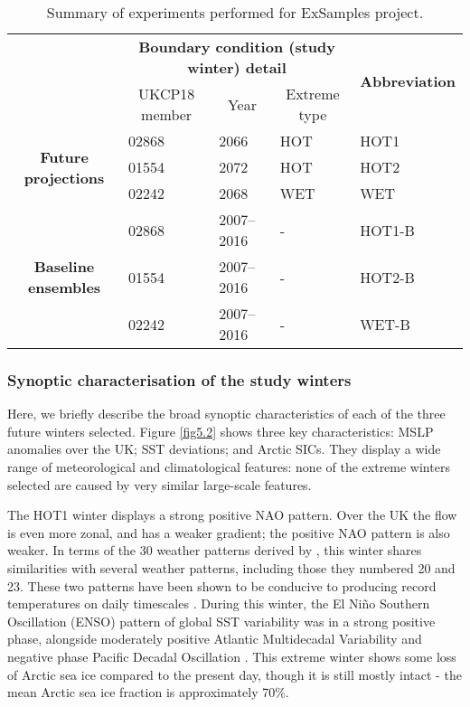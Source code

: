       \begin{table}[h]
        \centering
        \footnotesize
        \begin{tabular}{cllll}
          \toprule
          \multicolumn{1}{l}{\multirow{2}{*}{}}&\multicolumn{3}{c}{\textbf{Boundary condition (study winter) detail}}&\multicolumn{1}{c}{\multirow{2}{*}{\textbf{Abbreviation}}}\\\cmidrule(lr){2-4}
          \multicolumn{1}{l}{}&\multicolumn{1}{c}{UKCP18 member}&\multicolumn{1}{c}{Year}&\multicolumn{1}{c}{Extreme type}&\multicolumn{1}{c}{}\\\midrule
          \multirow{3}{*}{\textbf{Future projections}}&\multicolumn{1}{l}{02868}&\multicolumn{1}{l}{2066}&HOT&HOT1\\
          &\multicolumn{1}{l}{01554}&\multicolumn{1}{l}{2072}&HOT&HOT2\\
          &\multicolumn{1}{l}{02242}&\multicolumn{1}{l}{2068}&WET&WET\\\midrule
          \multirow{3}{*}{\textbf{Baseline ensembles}}&\multicolumn{1}{l}{02868}&\multicolumn{1}{l}{2007--2016}&-&HOT1-B\\
          &\multicolumn{1}{l}{01554}&\multicolumn{1}{l}{2007--2016}&-&HOT2-B\\
          &\multicolumn{1}{l}{02242}&\multicolumn{1}{l}{2007--2016}&-&WET-B\\\bottomrule
        \end{tabular}
        \caption{Summary of experiments performed for ExSamples project.}
        \end{table}

    \subsubsection{Synoptic characterisation of the study winters}

      Here, we briefly describe the broad synoptic characteristics of each of the three future winters selected. Figure \ref{fig5.2} shows three key characteristics: MSLP anomalies over the UK; SST deviations; and Arctic SICs. They display a wide range of meteorological and climatological features: none of the extreme winters selected are caused by very similar large-scale features.

      The HOT1 winter displays a strong positive NAO pattern. Over the UK the flow is even more zonal, and has a weaker gradient; the positive NAO pattern is also weaker. In terms of the 30 weather patterns derived by \citep{neal_flexible_2016}, this winter shares similarities with several weather patterns, including those they numbered 20 and 23. These two patterns have been shown to be conducive to producing record temperatures on daily timescales \citep{kendon_temperature_2020}. During this winter, the El Niño Southern Oscillation (ENSO) pattern of global SST variability was in a strong positive phase, alongside moderately positive Atlantic Multidecadal Variability and negative phase Pacific Decadal Oscillation \citep{deser_sea_2010}. This extreme winter shows some loss of Arctic sea ice compared to the present day, though it is still mostly intact - the mean Arctic sea ice fraction is approximately 70\%.

